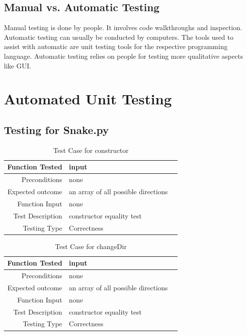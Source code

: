 \documentclass[12pt]{article}
\begin{document}
\subsection{Manual vs. Automatic Testing}
Manual testing is done by people. It involves code walkthroughs and inspection. \newline\newline
Automatic testing can usually be conducted by computers. The tools used to assist with automatic are unit testing tools for the respective programming language. Automatic testing relies on people for testing more qualitative aspects like GUI. 


\section{Automated Unit Testing}
\subsection{Testing for Snake.py}
\begin{center}
	\begin{longtable}{ | r | p{4cm} | p{4cm} }
	\caption{Test Case for constructor} \\ \hline \label{TblInputVar} 
	Function Tested & input\\ \hline
	Preconditions & none \\ \hline
	Expected outcome & an array of all possible directions \\ \hline
	Function Input & none \\ \hline
	Test Description & constructor equality test\\ \hline
	Testing Type & Correctness\\ \hline
	
	\end{longtable}
\end{center}

\begin{center}
	\begin{longtable}{ | r | p{4cm} | p{4cm} }
	\caption{Test Case for changeDir} \\ \hline \label{TblInputVar} 
	Function Tested & input\\ \hline
	Preconditions & none \\ \hline
	Expected outcome & an array of all possible directions \\ \hline
	Function Input & none \\ \hline
	Test Description & constructor equality test\\ \hline
	Testing Type & Correctness\\ \hline
	
	\end{longtable}
\end{center}
\end{document}
